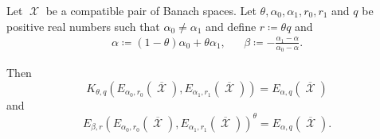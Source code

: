 \begin{theorem}\label{thm:interpolation_space_and_approximation_space_reiteration}\mcite\cite[thm. 7.1.8]{Bergh1976}
  Let \( \mscrX \) be a compatible pair of Banach spaces. Let \( \theta, \alpha_0, \alpha_1, r_0, r_1 \) and \( q \) be positive real numbers such that \( \alpha_0 \neq \alpha_1 \) and define \( r \coloneqq \theta q \) and
  \begin{align*}
    \alpha \coloneqq (1 - \theta) \alpha_0 + \theta \alpha_1,
    &&
    \beta \coloneqq - \frac {\alpha_1 - \alpha} {\alpha_0 - \alpha}.
  \end{align*}

  Then
  \begin{equation*}
    K_{\theta,q}(E_{\alpha_0,r_0}(\overline{\mscrX}), E_{\alpha_1,r_1}(\overline{\mscrX})) = E_{\alpha,q}(\overline{\mscrX})
  \end{equation*}
  and
  \begin{equation*}
    E_{\beta,r}(E_{\alpha_0,r_0}(\overline{\mscrX}), E_{\alpha_1,r_1}(\overline{\mscrX}))^\theta = E_{\alpha,q}(\overline{\mscrX}).
  \end{equation*}
\end{theorem}
